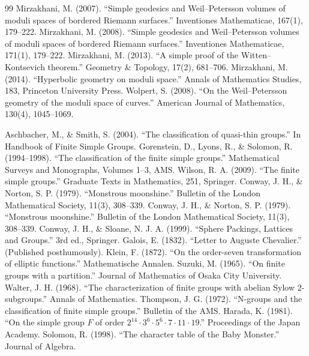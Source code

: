 \begin{thebibliography}{99}
 Mirzakhani, M. (2007). ``Simple geodesics and Weil--Petersson volumes of moduli spaces of bordered Riemann surfaces.'' Inventiones Mathematicae, 167(1), 179--222.
 Mirzakhani, M. (2008). ``Simple geodesics and Weil--Petersson volumes of moduli spaces of bordered Riemann surfaces.'' Inventiones Mathematicae, 171(1), 179--222.
 Mirzakhani, M. (2013). ``A simple proof of the Witten--Kontsevich theorem.'' Geometry \& Topology, 17(2), 681--706.
 Mirzakhani, M. (2014). ``Hyperbolic geometry on moduli space.'' Annals of Mathematics Studies, 183, Princeton University Press.
 Wolpert, S. (2008). ``On the Weil--Petersson geometry of the moduli space of curves.'' American Journal of Mathematics, 130(4), 1045--1069.

 Aschbacher, M., \& Smith, S. (2004). ``The classification of quasi-thin groups.'' In Handbook of Finite Simple Groups.
 Gorenstein, D., Lyons, R., \& Solomon, R. (1994--1998). ``The classification of the finite simple groups.'' Mathematical Surveys and Monographs, Volumes 1--3, AMS.
 Wilson, R. A. (2009). ``The finite simple groups.'' Graduate Texts in Mathematics, 251, Springer.
 Conway, J. H., \& Norton, S. P. (1979). ``Monstrous moonshine.'' Bulletin of the London Mathematical Society, 11(3), 308--339.
 Conway, J. H., \& Norton, S. P. (1979). ``Monstrous moonshine.'' Bulletin of the London Mathematical Society, 11(3), 308--339.
 Conway, J. H., \& Sloane, N. J. A. (1999). ``Sphere Packings, Lattices and Groups.'' 3rd ed., Springer.
 Galois, E. (1832). ``Letter to Auguste Chevalier.'' (Published posthumously).
 Klein, F. (1872). ``On the order-seven transformation of elliptic functions.'' Mathematische Annalen.
 Suzuki, M. (1965). ``On finite groups with a partition.'' Journal of Mathematics of Osaka City University.
 Walter, J. H. (1968). ``The characterization of finite groups with abelian Sylow 2-subgroups.'' Annals of Mathematics.
 Thompson, J. G. (1972). ``N-groups and the classification of finite simple groups.'' Bulletin of the AMS.
 Harada, K. (1981). ``On the simple group $F$ of order $2^{14} \cdot 3^6 \cdot 5^6 \cdot 7 \cdot 11 \cdot 19$.'' Proceedings of the Japan Academy.
 Solomon, R. (1998). ``The character table of the Baby Monster.'' Journal of Algebra.


\end{thebibliography}
